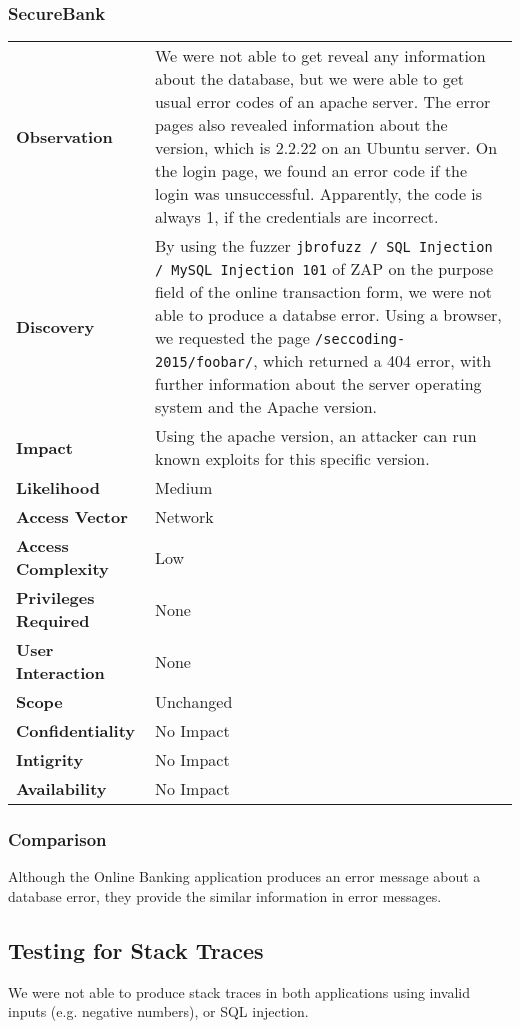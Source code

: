 \subsubsection*{SecureBank}
\begin{tabular}{l|p{10cm}}

\textbf{Observation} & We were not able to get reveal any information about the database, but we were able to get usual error codes of an apache server. The error pages also revealed information about the version, which is 2.2.22 on an Ubuntu server. On the login page, we found an error code if the login was unsuccessful. Apparently, the code is always 1, if the credentials are incorrect. \\
\textbf{Discovery} & By using the fuzzer \texttt{jbrofuzz / SQL Injection / MySQL Injection 101} of ZAP on the purpose field of the online transaction form, we were not able to produce a databse error. Using a browser, we requested the page \texttt{/seccoding-2015/foobar/}, which returned a 404 error, with further information about the server operating system and the Apache version. \\
\textbf{Impact} & Using the apache version, an attacker can run known exploits for this specific version. \\
\textbf{Likelihood} & Medium \\
\textbf{Access Vector} & Network \\
\textbf{Access Complexity} & Low \\
\textbf{Privileges Required} & None \\
\textbf{User Interaction} & None \\
\textbf{Scope} & Unchanged \\
\textbf{Confidentiality} & No Impact \\
\textbf{Intigrity} & No Impact \\
\textbf{Availability} & No Impact \\
\end{tabular}

\subsubsection*{Comparison}
Although the Online Banking application produces an error message about a database error, they provide the similar information in error messages.

\subsection{Testing for Stack Traces}
We were not able to produce stack traces in both applications using invalid inputs (e.g. negative numbers), or SQL injection.

